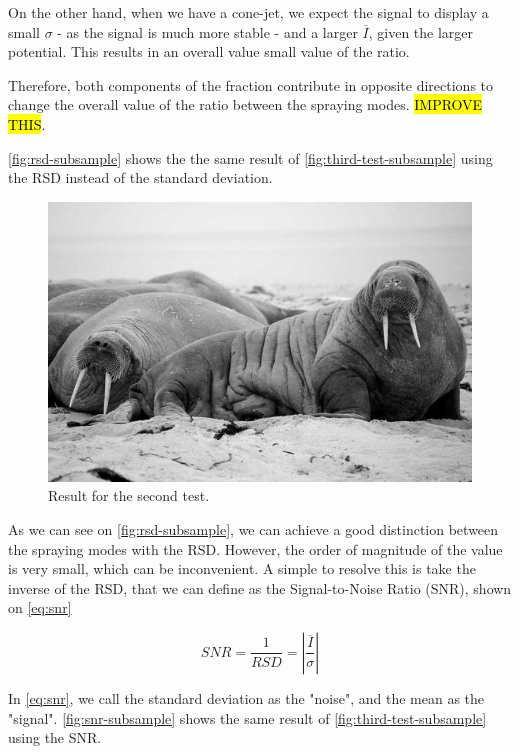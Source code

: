 \documentclass[oneside,12pt]{article}
\begin{document}
On the other hand, when we have a cone-jet, we expect the signal to display a small $\sigma$ - as the signal is much more stable -
and a larger $\overline{I}$, given the larger potential. This results in an overall value small value of the ratio.

Therefore, both components of the fraction contribute in opposite directions to change the overall value of the ratio between the spraying modes.
\hl{IMPROVE THIS}.

\autoref{fig:rsd-subsample} shows the the same result of \autoref{fig:third-test-subsample} using the RSD instead of the standard deviation.

\begin{figure}[h!]
    \centering
    \includegraphics[width=.8\textwidth,trim=1 1 1 1,clip]{figures/lorem-picsum.jpg}
    \caption{Result for the second test.}
    \label{fig:rsd-subsample}
\end{figure}

As we can see on \autoref{fig:rsd-subsample}, we can achieve a good distinction between the spraying modes with the RSD. However, the 
order of magnitude of the value is very small, which can be inconvenient. A simple to resolve this is take the inverse of the RSD, that 
we can define as the Signal-to-Noise Ratio (SNR), shown on \autoref{eq:snr}

\begin{equation} \label{eq:snr}
    SNR = \frac{1}{RSD} = \left|\frac{\overline{I}}{\sigma}\right|
\end{equation}

In \autoref{eq:snr}, we call the standard deviation as the "noise", and the mean as the "signal". \autoref{fig:snr-subsample} shows the
same result of \autoref{fig:third-test-subsample} using the SNR.
\end{document}
